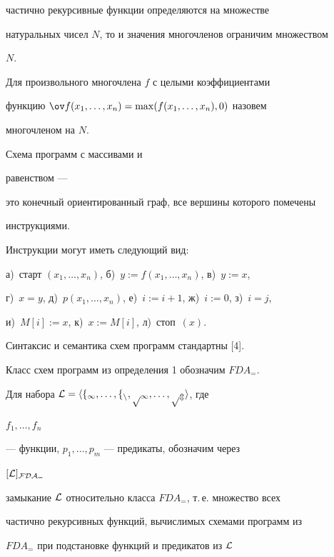 частично рекурсивные функции определяются на множестве 


натуральных чисел $N$, то и значения многочленов ограничим множеством 


$N$. 


Для произвольного многочлена $f$ с целыми коэффициентами 


функцию $\ov f(x_1,\dotsc,x_n)=\max(f(x_1,\dotsc,x_n),0)$ назовем 


многочленом на $N$. 


 


\begin{defn} Схема программ с массивами и 


равенством --- 


это конечный ориентированный граф, все вершины которого помечены 


инструкциями. 


 


Инструкции могут иметь следующий вид: 


а)~старт $(x_1,\dotsc,x_n)$, б)~$y:=f(x_1,\dotsc,x_n)$, в)~$y:=x$, 


г)~$x=y$, д)~$p(x_1,\dotsc,x_n)$, е)~$i:=i+1$, ж)~$i:=0$, з)~$i=j$, 


и)~$M[i]:=x$, к)~$x:=M[i]$, л)~стоп~$(x)$. 


\end{defn} 


 


Синтаксис и семантика схем программ стандартны [4]. 


 


Класс схем программ из определения 1 обозначим $FDA_=$. 


 


Для набора $\cal L=\langle f_1,\dotsc,f_n,p_1,\dotsc,p_m\rangle$, где 


$f_1,\dotsc,f_n$ 


--- функции, $p_1,\dotsc,p_m$ --- предикаты, обозначим через 


$[\cal L]_{FDA_=}$ 


замыкание $\cal L$ относительно класса $FDA_=$, т.\,е. множество всех 


частично рекурсивных функций, вычислимых схемами программ из 


$FDA_=$ при подстановке функций и предикатов из $\cal L$ 


